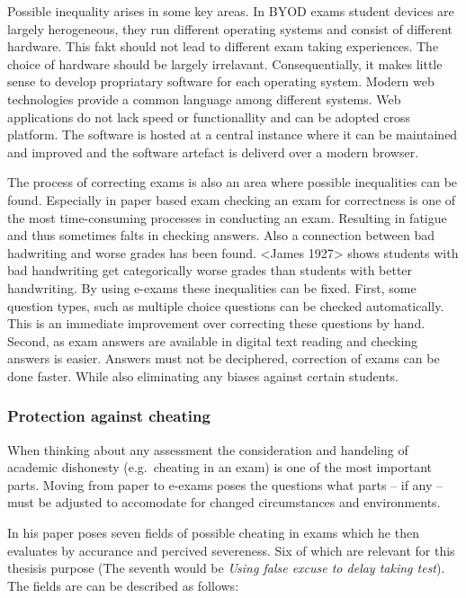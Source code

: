 Possible inequality arises in some key areas. In BYOD exams student
devices are largely herogeneous, they run different operating systems
and consist of different hardware. This fakt should not lead to
different exam taking experiences. The choice of hardware should be
largely irrelavant. Consequentially, it makes little sense to develop
propriatary software for each operating system. Modern web technologies
provide a common language among different systems. Web applications do
not lack speed or functionallity and can be adopted cross platform. The
software is hosted at a central instance where it can be maintained and
improved and the software artefact is deliverd over a modern browser.

The process of correcting exams is also an area where possible
inequalities can be found. Especially in paper based exam checking an
exam for correctness is one of the most time-consuming processes in
conducting an exam. Resulting in fatigue and thus sometimes falts in
checking answers. Also a connection between bad hadwriting and worse
grades has been found. \textless{}James 1927\textgreater{} shows
students with bad handwriting get categorically worse grades than
students with better handwriting. By using e-exams these inequalities
can be fixed. First, some question types, such as multiple choice
questions can be checked automatically. This is an immediate improvement
over correcting these questions by hand. Second, as exam answers are
available in digital text reading and checking answers is easier.
Answers must not be deciphered, correction of exams can be done faster.
While also eliminating any biases against certain students.

\hypertarget{protection-against-cheating}{%
\subsubsection{Protection against
cheating}\label{protection-against-cheating}}

When thinking about any assessment the consideration and handeling of
academic dishonesty (e.g.~cheating in an exam) is one of the most
important parts. Moving from paper to e-exams poses the questions what
parts -- if any -- must be adjusted to accomodate for changed
circumstances and environments.

In his paper poses seven fields of possible cheating in exams which he
then evaluates by accurance and percived severeness. Six of which are
relevant for this thesisis purpose (The seventh would be \emph{Using
false excuse to delay taking test}). The fields are can be described as
follows:

